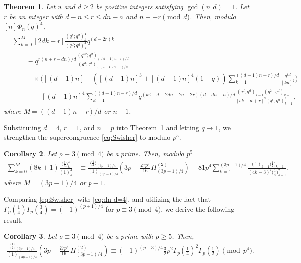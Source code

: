 \documentclass[12pt]{article}
\newtheorem{thm}{Theorem}[section]
\newtheorem{cor}[thm]{Corollary}
\numberwithin{equation}{section}
\begin{document}
\begin{thm}\label{thm:main-2}
    Let $n$ and $d\geqslant2$ be positive integers satisfying $\gcd(n,d)=1$. Let $r$ be an integer with $d-n\leqslant r \leqslant dn-n$ and 
    $n\equiv -r \pmod{d} $. Then, modulo $[n]\Phi_{n}(q)^4$,
    \begin{align*}
        &\sum_{k=0}^{M}[2dk+r]\frac{(q^r;q^d)_k^4}{(q^d;q^d)_k^4}q^{(d-2r)k}\nonumber\\
        &\hspace{2em}\equiv q^{r(n+r-dn)/d}\frac{(q^{2r};q^d)_{((d-1)n-r)/d}}{(q^{d};q^d)_{((d-1)n-r)/d}}\nonumber\\
        &\hspace{3em}\times\Bigg([(d-1)n]-([(d-1)n]^3+[(d-1)n]^4(1-q))\sum_{k=1}^{((d-1)n-r)/d}\frac{q^{kd}}{[kd]^2}\Bigg)\nonumber\\
        &\hspace{3em}+[(d-1)n]^4\sum_{k=1}^{((d-1)n-r)/d}q^{(kd-d-2dn+2n+2r)(d-dn+n)/d}\frac{(q^d;q^d)_{k-1}(q^{2r};q^d)_{k-1}}{[dk-d+r]^3(q^r;q^d)_{k-1}^2},
    \end{align*}
    where $M=((d-1)n-r)/d$ or $n-1$.
\end{thm}
Substituting $d=4$, $r=1$, and $n=p$ into Theorem~\ref{thm:main-2} and letting $q\to1$,
we strengthen the supercongruence \eqref{eq:Swisher} to modulo $p^5$.
\begin{cor}
    Let $p\equiv 3\pmod4$ be a prime. Then, modulo $p^5$
\begin{align}\label{eq:dn-d=4}
\sum_{k=0}^{M}(8k+1)\frac{\big(\tfrac14\big)_k^{4}}{(1)_k^{4}}
&\equiv
\frac{\big(\tfrac12\big)_{(3p-1)/4}}{(1)_{(3p-1)/4}}
\left(
3p-\frac{27p^3}{16}\,H_{(3p-1)/4}^{(2)}
\right)
+81p^4
\sum_{k=1}^{(3p-1)/4}
\frac{(1)_{k-1}\big(\tfrac12\big)_{k-1}}
{(4k-3)^3\big(\tfrac14\big)_{k-1}^2},
\end{align}
where $M=(3p-1)/4$ or $p-1$.
\end{cor}
Comparing \eqref{eq:Swisher} with \eqref{eq:dn-d=4}, and utilizing 
the fact that $\Gamma_p(\tfrac14)\Gamma_p(\tfrac34)=(-1)^{(p+1)/4}$ 
for $p\equiv 3 \pmod4$, we derive the following result.
\begin{cor}
    Let $p\equiv3\pmod4$ be a prime with $p\geqslant5$. Then,
    \begin{align*}
        \frac{\big(\tfrac12\big)_{(3p-1)/4}}{(1)_{(3p-1)/4}}
\left(
3p-\frac{27p^3}{16}\,H_{(3p-1)/4}^{(2)}
\right)\equiv (-1)^{(p-3)/4}\frac32p^2\Gamma_p(\tfrac14)^2\Gamma_p(\tfrac12)\pmod{p^4}.
    \end{align*}
\end{cor}
\end{document}
